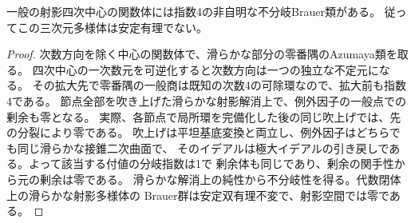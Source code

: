 \begin{corollary}\label{cor:quartic-center-unramified-brauer}
一般の射影四次中心の関数体には指数4の非自明な不分岐Brauer類がある。
従ってこの三次元多様体は安定有理でない。
\end{corollary}
\begin{proof}
次数方向を除く中心の関数体で、滑らかな部分の零番隅のAzumaya類を取る。
四次中心の一次数元を可逆化すると次数方向は一つの独立な不定元になる。
その拡大先で零番隅の一般商は既知の次数4の可除環なので、拡大前も指数4である。
節点全部を吹き上げた滑らかな射影解消上で、例外因子の一般点での剰余も零となる。
実際、各節点で局所環を完備化した後の同じ吹上げでは、先の分裂により零である。
吹上げは平坦基底変換と両立し、例外因子はどちらでも同じ滑らかな接錐二次曲面で、
そのイデアルは極大イデアルの引き戻しである。よって該当する付値の分岐指数は1で
剰余体も同じであり、剰余の関手性から元の剰余は零である。
滑らかな解消上の純性から不分岐性を得る。代数閉体上の滑らかな射影多様体の
Brauer群は安定双有理不変で、射影空間では零である。
\end{proof}
